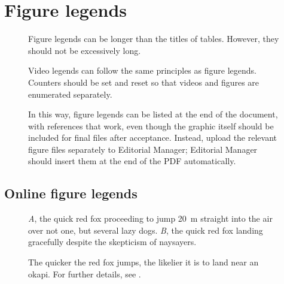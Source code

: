 \documentclass[11pt]{article}
\begin{document}
\newpage{}

\section*{Figure legends}

\begin{figure}[h!]
\caption{Figure legends can be longer than the titles of tables. However, they should not be excessively long.}
\label{Fig:OkapiHorn}
\end{figure}




\renewcommand{\figurename}{Video} 
\setcounter{figure}{0}


\begin{figure}[h!]
\caption{Video legends can follow the same principles as figure legends. Counters should be set and reset so that videos and figures are enumerated separately.}
\label{VideoExample}
\end{figure}
\renewcommand{\figurename}{Figure}
\setcounter{figure}{1}



\begin{figure}[h!]
\caption{In this way, figure legends can be listed at the end of the document, with references that work, even though the graphic itself should be included for final files after acceptance. Instead, upload the relevant figure files separately to Editorial Manager; Editorial Manager should insert them at the end of the PDF automatically.}
\label{Fig:AnotherFigure}
\end{figure}

\subsection*{Online figure legends}

\renewcommand{\thefigure}{A\arabic{figure}}
\setcounter{figure}{0}

\begin{figure}[h!]
\caption{\textit{A}, the quick red fox proceeding to jump 20~m straight into the air over not one, but several lazy dogs. \textit{B}, the quick red fox landing gracefully despite the skepticism of naysayers.}
\label{Fig:Jumps}
\end{figure}

\begin{figure}[h!]
\caption{The quicker the red fox jumps, the likelier it is to land near an okapi. For further details, see \citet{LemKapEx07}.}
\label{Fig:JumpsOk}
\end{figure}

\renewcommand{\thefigure}{B\arabic{figure}}
\setcounter{figure}{0}
\end{document}
